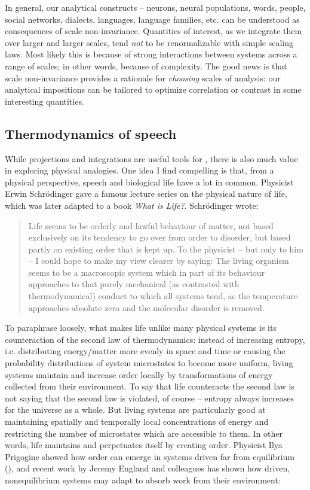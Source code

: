   In general, our analytical constructs -- neurons, neural populations, words, people, social networks, dialects, languages, language families, etc. can be understood as consequences of scale non-invariance. Quantities of interest, as we integrate them over larger and larger scales, tend \textit{not} to be renormalizable with simple scaling laws. Most likely this is because of strong interactions between systems across a range of scales; in other words, because of complexity. The good news is that scale non-invariance provides a rationale for \textit{choosing} scales of analysis: our analytical impositions can be tailored to optimize correlation or contrast in some interesting quantities.

\subsection{Thermodynamics of speech}

While projections and integrations are useful tools for , there is also much value in exploring physical analogies. One idea I find compelling is that, from a physical perspective, speech and biological life have a lot in common. Physicist Erwin Schrödinger gave a famous lecture series on the physical nature of life, which was later adapted to a book \textit{What is Life?}. Schrödinger wrote:

\begin{quote}
Life seems to be orderly and lawful behaviour of matter, not based exclusively on its tendency to go over from order to disorder, but based partly on existing order that is kept up. To the physicist -- but only to him -- I could hope to make my view clearer by saying: The living organism seems to be a macroscopic system which in part of its behaviour approaches to that purely mechanical (as contrasted with thermodynamical) conduct to which all systems tend, as the temperature approaches absolute zero and the molecular disorder is removed. \citep{Schrödinger1944}
\end{quote}

  To paraphrase loosely, what makes life unlike many physical systems is its counteraction of the second law of thermodynamics: instead of increasing entropy, i.e. distributing energy/matter more evenly in space and time or causing the probability distributions of system microstates to become more uniform, living systems maintain and increase order locally by transformations of energy collected from their environment. To say that life counteracts the second law is not saying that the second law is violated, of course -- entropy always increases for the universe as a whole. But living systems are particularly good at maintaining spatially and temporally local concentrations of energy and restricting the number of microstates which are accessible to them. In other words, life maintains and perpetuates itself by creating order. Physicist Ilya Prigogine showed how order can emerge in systems driven far from equilibrium (\citealt{KondepudiPrigogine1998,NicolisPrigogine1977,PrigogineStengers1984}), and recent work by Jeremy England and colleagues has shown how driven, nonequilibrium systems may adapt to absorb work from their environment:

